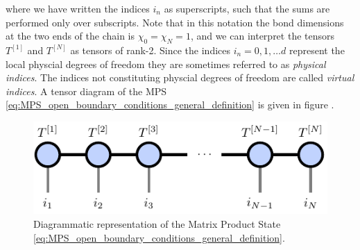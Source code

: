 where we have written the indices $i_n$ as superscripts, such that the sums are performed only over subscripts. Note that in this notation the bond dimensions at the two ends of the chain is $\chi_0 = \chi_{N} = 1$, and we can interpret the tensors $T^{[1]}$ and $T^{[N]}$ as tensors of rank-2. Since the indices $i_n = 0, 1, \dots d$ represent the local physcial degrees of freedom they are sometimes referred to as \textit{physical indices}. The indices not constituting physcial degrees of freedom are called \textit{virtual indices}. A tensor diagram of the MPS \eqref{eq:MPS_open_boundary_conditions_general_definition} is given in figure .\par
\begin{figure}
	\centering
	\includegraphics[scale=1]{figures/tikz/Tensor_Networks/mps_basic/mps_basic.pdf}
	\caption{Diagrammatic representation of the Matrix Product State \ref{eq:MPS_open_boundary_conditions_general_definition}.}
	\label{fig:mps_general}
\end{figure}
